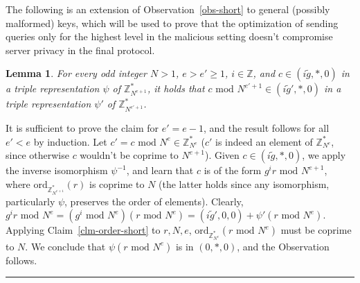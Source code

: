 \documentclass[11pt]{article}
\newtheorem{lemma}[theorem]{Lemma}
\newenvironment{proof}{\noindent {\bf Proof:} \hspace{.677em}}%
                     {\qed}
\newcommand{\qed}{\hspace*{\fill}\rule{0.6em}{0.6em}}
\newcommand{\Z}{\mathbb{Z}}
\newcommand{\U}[1]{\mathbb{Z}_{#1}^*}
\newcommand{\order}{{\mathrm{ord}}}
\renewcommand{\mod}{{\,\,\mathrm{mod}\,\,}}
\begin{document}
The following is an extension of Observation~\ref{obs-short} to
general (possibly malformed) keys, which will be used to prove that
the optimization of sending queries only for the highest level in
the malicious setting doesn't compromise server privacy in the
final protocol.
\begin{lemma}
\label{lem-short-mal} For every odd integer $N>1$, $e>e'\geq 1$,
$i\in\Z$, and $c\in(i\tilde{g},*,0)$ in a triple  representation
$\psi$ of $\U{N^{e+1}}$, it holds that $c\mod
N^{e'+1}\in(i\tilde{g}',*,0)$ in a triple representation $\psi'$ of
$\U{N^{e'+1}}$.
\end{lemma}
\begin{proof}
It is sufficient to prove the claim for $e'=e-1$, and the result
follows for all $e'<e$ by induction. Let $c'=c\mod N^e\in \U{N^e}$
($c'$ is indeed an element of $\U{N^e}$, since otherwise $c$
wouldn't be coprime to $N^{e+1}$). Given $c\in(i\tilde{g},*,0)$, we
apply the inverse isomorphism $\psi^{-1}$, and learn that $c$ is of
the form $g^ir \mod N^{e+1}$, where $\order_{\U{N^{e+1}}}(r)$ is
coprime to $N$ (the latter holds since any isomorphism,
particularly $\psi$, preserves the order of elements). Clearly,
$g^ir\mod N^e=(g^i\mod N^e)(r\mod
N^e)=(i\tilde{g}',0,0)+\psi'(r\mod N^e)$. Applying
Claim~\ref{clm-order-short} to $r,N,e$, $\order_{\U{N^e}}(r\mod
N^e)$ must be coprime to $N$. We conclude that $\psi(r\mod N^e)$ is
in $(0,*,0)$, and the Observation follows.
\end{proof}
\end{document}

